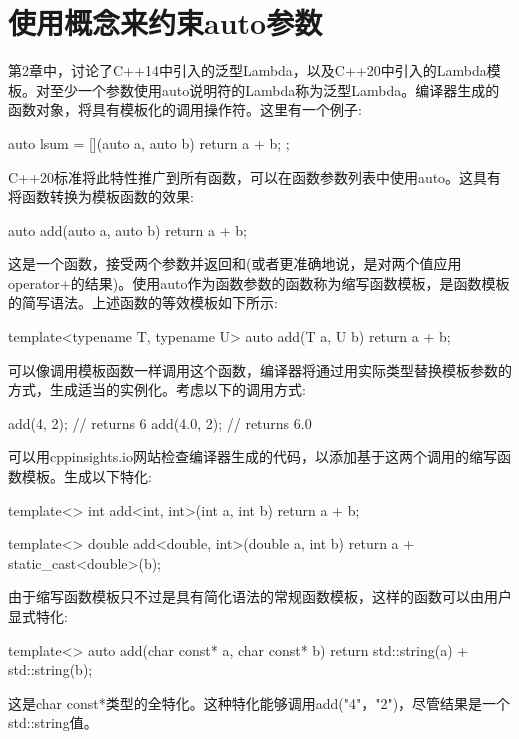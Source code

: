 \section{使用概念来约束auto参数}
第2章中，讨论了C++14中引入的泛型Lambda，以及C++20中引入的Lambda模板。对至少一个参数使用auto说明符的Lambda称为泛型Lambda。编译器生成的函数对象，将具有模板化的调用操作符。这里有一个例子:

\begin{cpp}
auto lsum = [](auto a, auto b) {return a + b; };
\end{cpp}

C++20标准将此特性推广到所有函数，可以在函数参数列表中使用auto。这具有将函数转换为模板函数的效果:

\begin{cpp}
auto add(auto a, auto b)
{
	return a + b;
}
\end{cpp}

这是一个函数，接受两个参数并返回和(或者更准确地说，是对两个值应用operator+的结果)。使用auto作为函数参数的函数称为缩写函数模板，是函数模板的简写语法。上述函数的等效模板如下所示:

\begin{cpp}
template<typename T, typename U>
auto add(T a, U b)
{
	return a + b;
}
\end{cpp}

可以像调用模板函数一样调用这个函数，编译器将通过用实际类型替换模板参数的方式，生成适当的实例化。考虑以下的调用方式:

\begin{cpp}
add(4, 2); // returns 6
add(4.0, 2); // returns 6.0
\end{cpp}

可以用cppinsights.io网站检查编译器生成的代码，以添加基于这两个调用的缩写函数模板。生成以下特化:

\begin{cpp}
template<>
int add<int, int>(int a, int b)
{
	return a + b;
}

template<>
double add<double, int>(double a, int b)
{
	return a + static_cast<double>(b);
}
\end{cpp}

由于缩写函数模板只不过是具有简化语法的常规函数模板，这样的函数可以由用户显式特化:

\begin{cpp}
template<>
auto add(char const* a, char const* b)
{
	return std::string(a) + std::string(b);
}
\end{cpp}

这是char const*类型的全特化。这种特化能够调用add("4"，"2")，尽管结果是一个std::string值。

